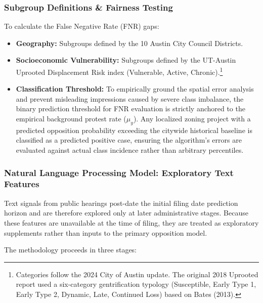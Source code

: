 \documentclass[11pt, letterpaper]{article}
\begin{document}
\subsubsection{Subgroup Definitions \& Fairness Testing}
To calculate the False Negative Rate (FNR) gaps:
\begin{itemize}
    \item \textbf{Geography:} Subgroups defined by the 10 Austin City Council Districts.
    \item \textbf{Socioeconomic Vulnerability:} Subgroups defined by the UT-Austin Uprooted Displacement Risk index (Vulnerable, Active, Chronic).\footnote{Categories follow the 2024 City of Austin update. The original 2018 Uprooted report used a six-category gentrification typology (Susceptible, Early Type 1, Early Type 2, Dynamic, Late, Continued Loss) based on Bates (2013).}
    \item \textbf{Classification Threshold:} To empirically ground the spatial error analysis and prevent misleading impressions caused by severe class imbalance, the binary prediction threshold for FNR evaluation is strictly anchored to the empirical background protest rate ($\mu_{y}$). Any localized zoning project with a predicted opposition probability exceeding the citywide historical baseline is classified as a predicted positive case, ensuring the algorithm's errors are evaluated against actual class incidence rather than arbitrary percentiles.
\end{itemize}

\subsubsection{Natural Language Processing Model: Exploratory Text Features}

Text signals from public hearings post-date the initial filing date prediction horizon and are therefore explored only at later administrative stages. Because these features are unavailable at the time of filing, they are treated as exploratory supplements rather than inputs to the primary opposition model.

The methodology proceeds in three stages:
\end{document}
